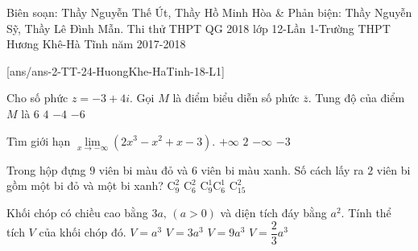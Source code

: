 \begin{name}
	{Biên soạn: Thầy Nguyễn Thế Út, Thầy Hồ Minh Hòa \& Phản biện: Thầy Nguyễn Sỹ, Thầy Lê Đình Mẫn. }
	{Thi thử THPT QG 2018 lớp 12-Lần 1-Trường THPT Hương Khê-Hà Tĩnh năm 2017-2018}
\end{name}
\setcounter{ex}{0}
[ans/ans-2-TT-24-HuongKhe-HaTinh-18-L1]
\begin{ex}%
	Cho số phức $ z=-3+4i $. Gọi $ M $ là điểm biểu diễn số phức $ \overline{z} $. Tung độ của điểm $ M $ là
	\choice
	{$6$}
	{$4$}
	{\True $-4$}
	{$-6$}
\end{ex}

\begin{ex}%
	Tìm giới hạn $ \lim\limits_{x\to -\infty}(2x^3-x^2+x-3) $.
	\choice
	{$+\infty$}
	{$2$}
	{\True $-\infty$}
	{$-3$}
\end{ex}

\begin{ex}%
	Trong hộp đựng $ 9 $ viên bi màu đỏ và $ 6 $ viên bi màu xanh. Số cách lấy ra $ 2 $ viên bi gồm một bi đỏ và một bi xanh?
	\choice
	{$\mathrm{C}_9^2$}
	{$\mathrm{C}_6^2$}
	{\True $\mathrm{C}_9^1\mathrm{C}_6^1$}
	{$\mathrm{C}_15^2$}
\end{ex}

\begin{ex}%
	Khối chóp có chiều cao bằng $ 3a , \,(a>0)$ và diện tích đáy bằng $ a^2 $. Tính thể tích $ V $ của khối chóp đó.
	\choice
	{\True $V=a^3$}
	{$V=3a^3$}
	{$V=9a^3$}
	{$V=\dfrac{2}{3}a^3$}
\end{ex}

